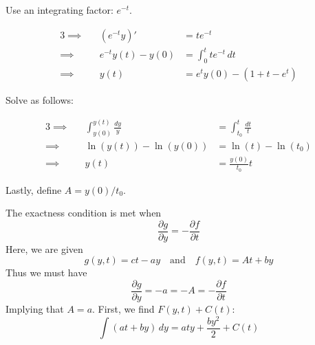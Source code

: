 \documentclass[a4paper]{article}
\begin{document}

Use an integrating factor: \(e^{-t}\).

\begin{alignat*}{3}
	\implies && \!\left( e^{-t}y \right)' & = te^{-t} \\
	\implies && e^{-t} y \!\left( t \right) - y \!\left( 0 \right)  & = \int^{t}_{0} te^{-t} \, dt  \\ 
	\implies && y \!\left( t \right) & = e^{t} y \!\left( 0 \right) - \!\left( 1 + t - e^{t} \right) 
\end{alignat*}


Solve as follows:

\begin{alignat*}{3}
	\implies && \int^{y \!\left( t \right) }_{y \!\left( 0 \right) } \frac{dy}{y} & = \int^{t}_{t_{0}} \frac{dt}{t}  \\
	\implies && \ln\left( y \!\left( t \right)  \right) - \ln\left( y \!\left( 0 \right)  \right) & = \ln\left( t \right) - \ln\left( t_{0} \right) \\
	\implies && y \!\left( t \right) & = \frac{y \!\left( 0 \right) }{t_{0}} t
\end{alignat*}

Lastly, define \(A = y \!\left( 0 \right) / t_{0}\).

\vspace{12pt}


The exactness condition is met when
\[
	\frac{\partial g}{\partial y} = -\frac{\partial f}{\partial t} 
\]
Here, we are given
\[
	g \!\left( y, t \right) = ct - ay \quad \text{and} \quad f \!\left( y,t \right) = At + by
\]
Thus we must have
\[
	\frac{\partial g}{\partial y} = -a = -A = -\frac{\partial f}{\partial t} 
\]
Implying that \(A = a\). First, we find \(F \!\left( y,t \right) + C \!\left( t \right) \):
\[
	\int \!\left( at + by \right)  \, dy  = aty + \frac{by^{2}}{2} + C \!\left( t \right)
\]
\end{document}
